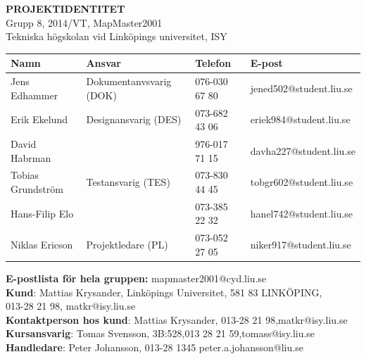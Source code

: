 \documentclass[a4paper,12pt,fleqn]{article}
\begin{document}
	
	\vspace{2cm}
	\newpage
\thispagestyle{empty}
	\vspace*{\fill}
		\begingroup
			\begin{center}
				\LARGE{\textbf{PROJEKTIDENTITET}}
				\\
				\footnotesize
				Grupp 8, 2014/VT, MapMaster2001
				\\
				Tekniska högskolan vid Linköpings universitet, ISY
				\\
				\vspace{1cm}
	  \begin{tabular}{| p{3cm} | p{4.3cm} | p{2.4cm} | p{3.8cm} |}
	    \hline
		\textbf{Namn} & \textbf{Ansvar} & \textbf{Telefon} & \textbf{E-post} \\ \hline
	    Jens Edhammer & Dokumentanvsvarig (DOK) & 076-030 67 80 & jened502@student.liu.se \\ \hline
		Erik Ekelund & Designansvarig (DES) & 073-682 43 06 & eriek984@student.liu.se \\ \hline
		David Habrman &  & 976-017 71 15 & davha227@student.liu.se \\ \hline 
		Tobias Grundström & Testansvarig (TES) & 073-830 44 45 & tobgr602@student.liu.se \\ \hline 
		Hans-Filip Elo &   & 073-385 22 32 & hanel742@student.liu.se \\ \hline 
		Niklas Ericson & Projektledare (PL) & 073-052 27 05 & niker917@student.liu.se \\ \hline
	    \end{tabular}
		
		\vspace{1cm}
		\textbf{E-postlista för hela gruppen:} mapmaster2001@cyd.liu.se
		\\[0.5cm]
		
		\textbf{Kund}: Mattias Krysander, Linköpings Universitet, 581 83  LINKÖPING, \\
		013-28 21 98, matkr@isy.liu.se \\
		\textbf{Kontaktperson hos kund}: Mattias Krysander, 013-28 21 98,matkr@isy.liu.se 
		\\
		\textbf{Kursansvarig}: Tomas Svensson, 3B:528,013 28 21 59,tomass@isy.liu.se
		\\[0.5cm]
		\textbf{Handledare}: Peter Johansson, 013-28 1345 peter.a.johansson@liu.se

				\end{center}
		\endgroup
	\vspace*{\fill}
\newpage
\end{document}
